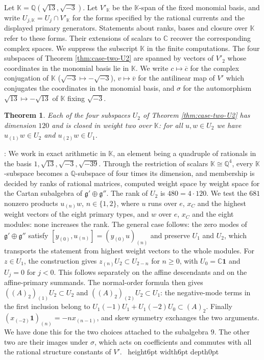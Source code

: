 \documentclass[leqno]{article}
\newcommand{\Cbb}{\ensuremath{\mathbb{C}}}
\newcommand{\K}{\ensuremath{\mathbb{K}}}
\renewcommand{\geq}{\ensuremath{\geqslant}}
\newcommand{\qed}{\hfill \vrule height6pt  width6pt depth0pt}
\newtheorem{thm}{Theorem}[section]
\newenvironment{proof}[1][]{\noindent {\it Proof #1} : }{\hbox{~}\qed
\smallskip
}
\numberwithin{equation}{section}
\begin{document}
Let $\K = \mathbb{Q}(\sqrt{13},\sqrt{-3})$. Let $V'_{\K}$ be the $\K$-span of the fixed monomial basis, and write $U_{j,\K} = U_j \cap V'_{\K}$ for the forms specified by the rational currents and the displayed primary generators. Statements about ranks, bases and closure over $\K$ refer to these forms. Their extensions of scalars to $\Cbb$ recover the corresponding complex spaces. We suppress the subscript $\K$ in the finite computations. The four subspaces of Theorem \ref{thm:case-two-U2} are spanned by vectors of $V'_2$ whose coordinates in the monomial basis lie in $\K$. We write $c \mapsto \overline{c}$ for the complex conjugation of $\K$ ($\sqrt{-3} \mapsto -\sqrt{-3}$), $v \mapsto \overline{v}$ for the antilinear map of $V'$ which conjugates the coordinates in the monomial basis, and $\sigma$ for the automorphism $\sqrt{13} \mapsto -\sqrt{13}$ of $\K$ fixing $\sqrt{-3}$.

\begin{thm}
\label{thm:exact-weight-two}
Each of the four subspaces $U_2$ of Theorem \ref{thm:case-two-U2} has dimension $120$ and is closed in weight two over $\K$: for all $u,w \in U_2$ we have $u_{(1)}w \in U_2$ and $u_{(2)}w \in U_1$.
\end{thm}

\begin{proof}
We work in exact arithmetic in $\K$, an element being a quadruple of rationals in the basis $1, \sqrt{13}, \sqrt{-3}, \sqrt{-39}$. Through the restriction of scalars $\K \cong \mathbb{Q}^4$, every $\K$-subspace becomes a $\mathbb{Q}$-subspace of four times its dimension, and membership is decided by ranks of rational matrices, computed weight space by weight space for the Cartan subalgebra of $\mathfrak g' \oplus \mathfrak g''$. The rank of $U_2$ is $480 = 4 \cdot 120$. We test the $681$ nonzero products $u_{(n)}w$, $n \in \{1,2\}$, where $u$ runs over $e$, $x_C$ and the highest weight vectors of the eight primary types, and $w$ over $e$, $x_C$ and the eight modules: none increases the rank. The general case follows: the zero modes of $\mathfrak g' \oplus \mathfrak g''$ satisfy $[y_{(0)}, u_{(n)}] = (y_{(0)}u)_{(n)}$ and preserve $U_1$ and $U_2$, which transports the statement from highest weight vectors to the whole modules. For $z \in U_1$, the construction gives $z_{(n)}U_2 \subset U_{2-n}$ for $n \geq 0$, with $U_0 = \Cbb\mathbf 1$ and $U_j = 0$ for $j < 0$. This follows separately on the affine descendants and on the affine-primary summands. The normal-order formula then gives $((A)_2)_{(1)}U_2 \subset U_2$ and $((A)_2)_{(2)}U_2 \subset U_1$: the negative-mode terms in the first inclusion belong to $U_1(-1)U_1 + U_1(-2)U_0 \subset (A)_2$. Finally $(x_{(-2)}\mathbf 1)_{(n)} = -n x_{(n-1)}$, and skew symmetry exchanges the two arguments. We have done this for the two choices attached to the subalgebra $9$. The other two are their images under $\sigma$, which acts on coefficients and commutes with all the rational structure constants of $V'$.
\end{proof}
\end{document}
